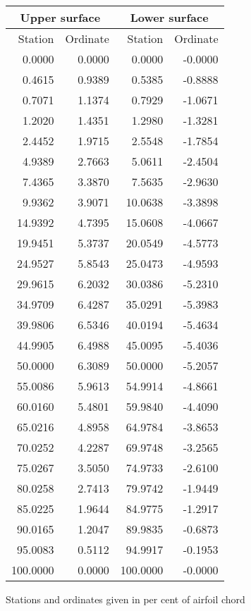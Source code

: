 \documentclass[11pt]{book}
\begin{document}
 \hspace{4mm}
 \begin{tabular}{|r|r|r|r|} \hline 
 \multicolumn{2}{|c|}{Upper surface} & \multicolumn{2}{|c|}{Lower surface} \\
 \hline
 Station & Ordinate & Station & Ordinate \\
 \hline
0.0000 & 0.0000 & 0.0000 & -0.0000 \\
0.4615 & 0.9389 & 0.5385 & -0.8888 \\
0.7071 & 1.1374 & 0.7929 & -1.0671 \\
1.2020 & 1.4351 & 1.2980 & -1.3281 \\
2.4452 & 1.9715 & 2.5548 & -1.7854 \\
4.9389 & 2.7663 & 5.0611 & -2.4504 \\
7.4365 & 3.3870 & 7.5635 & -2.9630 \\
9.9362 & 3.9071 & 10.0638 & -3.3898 \\
14.9392 & 4.7395 & 15.0608 & -4.0667 \\
19.9451 & 5.3737 & 20.0549 & -4.5773 \\
24.9527 & 5.8543 & 25.0473 & -4.9593 \\
29.9615 & 6.2032 & 30.0386 & -5.2310 \\
34.9709 & 6.4287 & 35.0291 & -5.3983 \\
39.9806 & 6.5346 & 40.0194 & -5.4634 \\
44.9905 & 6.4988 & 45.0095 & -5.4036 \\
50.0000 & 6.3089 & 50.0000 & -5.2057 \\
55.0086 & 5.9613 & 54.9914 & -4.8661 \\
60.0160 & 5.4801 & 59.9840 & -4.4090 \\
65.0216 & 4.8958 & 64.9784 & -3.8653 \\
70.0252 & 4.2287 & 69.9748 & -3.2565 \\
75.0267 & 3.5050 & 74.9733 & -2.6100 \\
80.0258 & 2.7413 & 79.9742 & -1.9449 \\
85.0225 & 1.9644 & 84.9775 & -1.2917 \\
90.0165 & 1.2047 & 89.9835 & -0.6873 \\
95.0083 & 0.5112 & 94.9917 & -0.1953 \\
100.0000 & 0.0000 & 100.0000 & -0.0000 \\
 \hline 
 \end{tabular}
 \vspace{8mm}

Stations and ordinates given in per cent of airfoil chord
\end{document}
